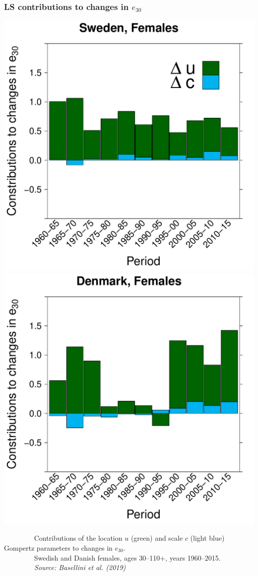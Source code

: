 \documentclass[12pt, xcolor=table]{beamer}  %
\begin{document}
\begin{frame}[noframenumbering]
	\frametitle{LS contributions to changes in $e_{30}$}
	\vspace{-0.25cm}
	\begin{center}
		\includegraphics[scale=0.32]{Figures/Ch1/F5a}\includegraphics[scale=0.32]{Figures/Ch1/F5b}
	\end{center}
	\vspace{-0.3cm}
	\tiny{$\quad\quad\quad\quad$ Contributions of the location $u$ (green) and scale $c$ (light blue) Gompertz
parameters to changes in $e_{30}$.\\ $\quad\quad\quad\quad$ Swedish and Danish females, ages 30--110+, years 1960--2015. \\ \emph{$\quad\quad\quad\quad$ Source: Basellini et al. (2019)}} \\


\end{frame}
\end{document}
